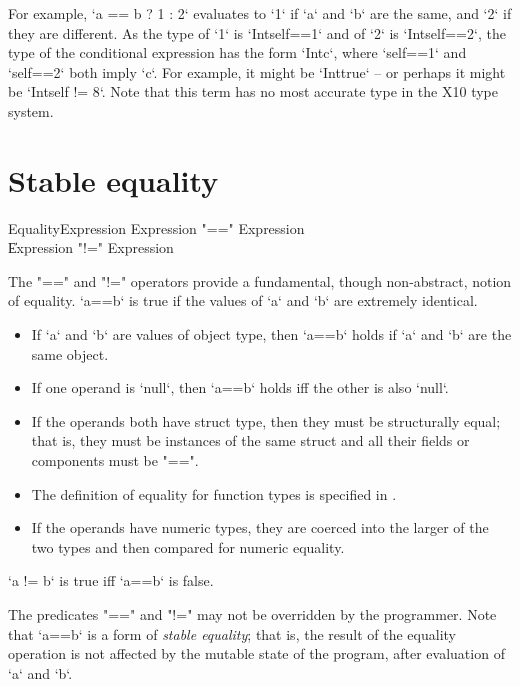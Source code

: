For example, 
\xcd`a == b ? 1 : 2`
evaluates to \xcd`1` if \xcd`a` and \xcd`b` are the same, and \xcd`2` if they
are different.   As the type of \xcd`1` is \xcd`Int{self==1}` and of \xcd`2`
is \xcd`Int{self==2}`, the type of the conditional expression has the form
\xcd`Int{c}`, where \xcd`self==1` and \xcd`self==2` both imply \xcd`c`.  For
example, it might be \xcd`Int{true}` -- or perhaps it might be 
\xcd`Int{self != 8}`. Note that this term has no most accurate type in the X10
type system.

\section{Stable equality}
\label{StableEquality}
\index{==}\index{!=}

\begin{grammar}
EqualityExpression \: Expression \xcd"==" Expression \\
\| Expression \xcd"!=" Expression \\
\end{grammar}

The \xcd"==" and \xcd"!=" operators provide a fundamental, though
non-abstract, notion of equality.  \xcd`a==b` is true if the values of \xcd`a`
and \xcd`b` are extremely identical.

\begin{itemize}
\item If \xcd`a` and \xcd`b` are values of object type, then \xcd`a==b` holds
      if \xcd`a` and \xcd`b` are the same object.
\item If one operand is \xcd`null`, then \xcd`a==b` holds iff the other is
      also \xcd`null`.
\item If the operands both have struct type, then they must be structurally equal;
that is, they must be instances of the same struct
and all their fields or components must be \xcd"==". 
\item The definition of equality for function types is specified in
      .
\item If the operands have numeric types, they are coerced into the larger of
      the two types and then compared for numeric equality.
\end{itemize}

\xcd`a != b`
is true iff \xcd`a==b` is false.

The predicates \xcd"==" and \xcd"!=" may not be overridden by the programmer.
Note that \xcd`a==b` is a form of \emph{stable equality}; that is, the result of
the equality operation is not affected by the mutable state of the program,
after evaluation of \xcd`a` and \xcd`b`. 



